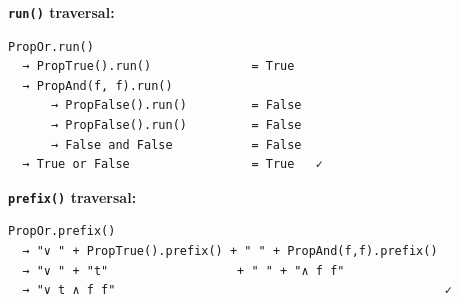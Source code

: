 \documentclass[12pt,a4paper]{article}
\begin{document}
\textbf{\texttt{run()} traversal:}

\begin{lstlisting}
PropOr.run()
  → PropTrue().run()              = True
  → PropAnd(f, f).run()
      → PropFalse().run()         = False
      → PropFalse().run()         = False
      → False and False           = False
  → True or False                 = True   ✓
\end{lstlisting}

\textbf{\texttt{prefix()} traversal:}

\begin{lstlisting}
PropOr.prefix()
  → "∨ " + PropTrue().prefix() + " " + PropAnd(f,f).prefix()
  → "∨ " + "t"                  + " " + "∧ f f"
  → "∨ t ∧ f f"                                              ✓
\end{lstlisting}
\end{document}

